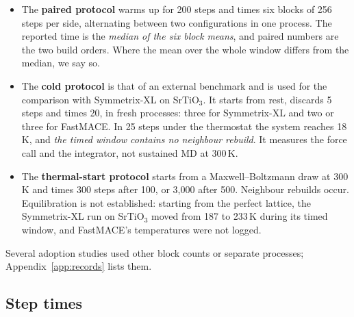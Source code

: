 \documentclass[11pt]{article}
\begin{document}
\begin{itemize}\setlength{\itemsep}{0.1em}
\item The \textbf{paired protocol} warms up for 200 steps and times six blocks of 256 steps per side,
      alternating between two configurations in one process. The reported time is the \emph{median of the six
      block means}, and paired numbers are the two build orders. Where the mean over the whole window differs
      from the median, we say so.
\item The \textbf{cold protocol} is that of an external benchmark and is used for the comparison with
      Symmetrix-XL on SrTiO$_3$. It starts from rest, discards 5 steps and times 20, in fresh processes: three
      for Symmetrix-XL and two or three for FastMACE. In 25 steps under the thermostat the system reaches 18\,K,
      and \emph{the timed window contains no neighbour rebuild}. It measures the force call and the integrator,
      not sustained MD at 300\,K.
\item The \textbf{thermal-start protocol} starts from a Maxwell--Boltzmann draw at 300\,K and times 300 steps
      after 100, or 3{,}000 after 500. Neighbour rebuilds occur. Equilibration is not established: starting
      from the perfect lattice, the Symmetrix-XL run on SrTiO$_3$ moved from 187 to 233\,K during its timed
      window, and FastMACE's temperatures were not logged.
\end{itemize}
Several adoption studies used other block counts or separate processes; Appendix~\ref{app:records} lists
them.

\subsection{Step times}
\end{document}
